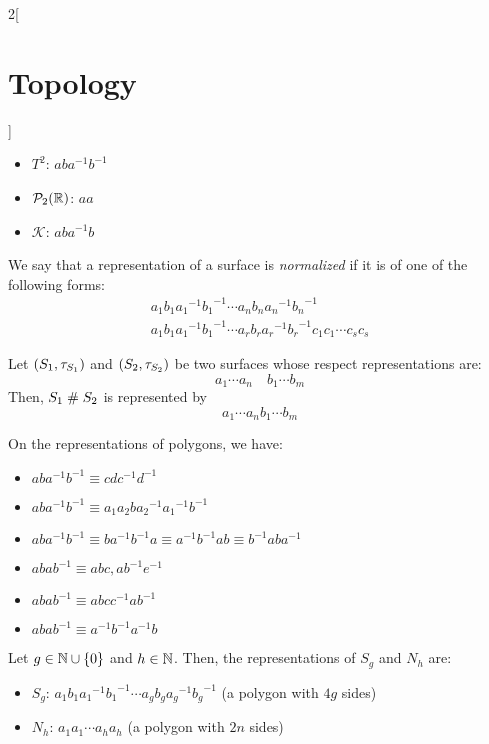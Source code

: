 \documentclass[../../../main.tex]{subfiles}
\begin{document}
\begin{multicols}{2}[\section{Topology}]
\begin{prop}
\begin{itemize}
      \item $T^2$: $aba^{-1}b^{-1}$
      \item $\mathcal{P}_2(\mathbb{R})$: $aa$
      \item $\mathcal{K}$: $aba^{-1}b$
    \end{itemize}
  \end{prop}
  \begin{definition}
    We say that a representation of a surface is \emph{normalized} if it is of one of the following forms:
    \begin{gather*}
      a_1b_1{a_1}^{-1}{b_1}^{-1}\cdots a_nb_n{a_n}^{-1}{b_n}^{-1}\\
      a_1b_1{a_1}^{-1}{b_1}^{-1}\cdots a_rb_r{a_r}^{-1}{b_r}^{-1}c_1c_1\cdots c_sc_s
    \end{gather*}
  \end{definition}
  \begin{prop}
    Let $(S_1,\tau_{S_1})$ and $(S_2,\tau_{S_2})$ be two surfaces whose respect representations are: $$a_1\cdots a_n\quad b_1\cdots b_m$$
    Then, $S_1\mathrel{\#} S_2$ is represented by $$a_1\cdots a_nb_1\cdots b_m$$
  \end{prop}
  \begin{prop}
    On the representations of polygons, we have:
    \begin{itemize}
      \item $aba^{-1}b^{-1}\equiv cdc^{-1}d^{-1}$
      \item $aba^{-1}b^{-1}\equiv a_1a_2b{a_2}^{-1}{a_1}^{-1}b^{-1}$
      \item $aba^{-1}b^{-1}\equiv ba^{-1}b^{-1}a\equiv a^{-1}b^{-1}ab\equiv b^{-1}aba^{-1}$
      \item $abab^{-1}\equiv abc, ab^{-1}e^{-1}$
      \item $abab^{-1}\equiv abcc^{-1}ab^{-1}$
      \item $abab^{-1}\equiv a^{-1}b^{-1}a^{-1}b$
    \end{itemize}
  \end{prop}
  \begin{corollary}
    Let $g\in\mathbb{N}\cup\{0\}$ and $h\in\mathbb{N}$. Then, the representations of $S_g$ and $N_h$ are:
    \begin{itemize}
      \item $S_g$: $a_1b_1{a_1}^{-1}{b_1}^{-1}\cdots a_gb_g{a_g}^{-1}{b_g}^{-1}$ (a polygon with $4g$ sides)
      \item $N_h$: $a_1a_1\cdots a_ha_h$ (a polygon with $2n$ sides)
    \end{itemize}

\end{corollary}
\end{multicols}
\end{document}
